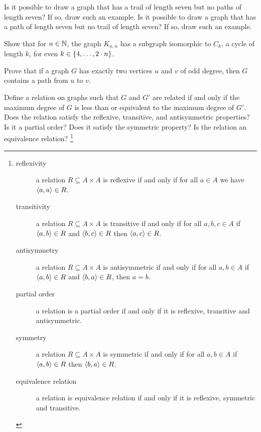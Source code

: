 \documentclass{article}
\begin{document}
\begin{exercise}
Is it possible to draw a graph that has a trail of length seven but no paths of length seven? If so, draw such an example. Is it possible to draw a graph that has a path of length seven but no trail of length seven? If so, draw such an example.
\end{exercise}

\begin{exercise}
Show that for $n\in\mathbb{N}$, the graph $K_{n,n}$ has a subgraph isomorphic to $C_k$, a cycle of length $k$, for even $k\in\left\{ 4,\ldots,2\cdot n \right\}$.
\end{exercise}

\begin{exercise}
Prove that if a graph $G$ has exactly two vertices $u$ and $v$ of odd degree, then $G$ contains a path from $u$ to $v$.
\end{exercise}

\begin{exercise}
Define a relation on graphs such that $G$ and $G'$ are related if and only if the maximum degree of $G$ is less than or equivalent to the maximum degree of $G'$. Does the relation satisfy the reflexive, transitive, and antisymmetric properties? Is it a partial order? Does it satisfy the symmetric property? Is the relation an equivalence relation?
\footnote{\begin{description}
 \item[reflexivity] a relation $R\subseteq A\times A$ is reflexive if and only if for all $a\in A$ we have $\left\langle a,a \right\rangle\in R$.
 \item[transitivity] a relation $R\subseteq A\times A$ is transitive if and only if for all $a,b,c\in A$ if $\left\langle a,b \right\rangle\in R$ and $\left\langle b,c \right\rangle\in R$ then $\left\langle a,c \right\rangle\in R$.
 \item[antisymmetry] a relation $R\subseteq A\times A$ is antisymmetric if and only if for all $a,b\in A$ if $\left\langle a,b \right\rangle\in R$ and $\left\langle b,a \right\rangle\in R$, then $a=b$.
 \item[partial order] a relation is a partial order if and only if it is reflexive, transitive and antisymmetric.
 \item[symmetry] a relation $R\subseteq A\times A$ is symmetric if and only if for all $a,b\in A$ if $\left\langle a,b \right\rangle\in R$ then $\left\langle b,a \right\rangle\in R$.
 \item[equivalence relation] a relation is equivalence relation if and only if it is reflexive, symmetric and transitive.
\end{description}}
\end{exercise}
\end{document}
